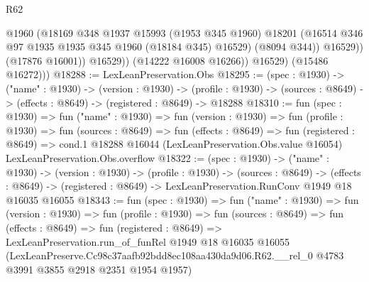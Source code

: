 \begin{lexlean}{R62}
\begin{coremodule}
                      @1960
                      (@18169
                        @348
                        @1937
                        @15993
                        (@1953 @345 @1960)
                        @18201
                        (@16514 @346 @97 @1935 @1935 @345 @1960 (@18184 @345) @16529)
                        (@8094 @344))
                      @16529))
                  (@17876 @16001))
                @16529))
            (@14222 @16008 @16266))
          @16529)
        (@15486 @16272)))
@18288 := LexLeanPreservation.Obs
@18295 := (spec : @1930) ->
  ("name" : @1930) ->
  (version : @1930) ->
  (profile : @1930) -> (sources : @8649) -> (effects : @8649) -> (registered : @8649) -> @18288
@18310 := fun (spec : @1930) =>
  fun ("name" : @1930) =>
  fun (version : @1930) =>
  fun (profile : @1930) =>
  fun (sources : @8649) =>
  fun (effects : @8649) =>
  fun (registered : @8649) =>
  cond.{1} @18288 @16044 (LexLeanPreservation.Obs.value @16054) LexLeanPreservation.Obs.overflow
@18322 := (spec : @1930) ->
  ("name" : @1930) ->
  (version : @1930) ->
  (profile : @1930) ->
  (sources : @8649) ->
  (effects : @8649) -> (registered : @8649) -> LexLeanPreservation.RunConv @1949 @18 @16035 @16055
@18343 := fun (spec : @1930) =>
  fun ("name" : @1930) =>
  fun (version : @1930) =>
  fun (profile : @1930) =>
  fun (sources : @8649) =>
  fun (effects : @8649) =>
  fun (registered : @8649) =>
  LexLeanPreservation.run_of_funRel
    @1949
    @18
    @16035
    @16055
    (LexLeanPreserve.Cc98c37aafb92bdd8ec108aa430da9d06.R62.__rel_0
      @4783
      @3991
      @3855
      @2918
      @2351
      @1954
      @1957)
\end{coremodule}
\end{lexlean}

